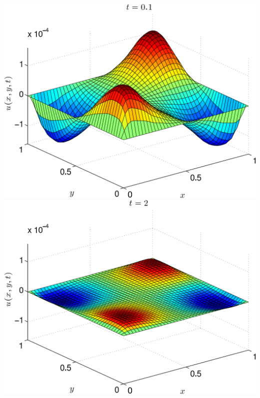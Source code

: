 {\begin{solution}
\begin{enumerate}
\includegraphics[scale=0.4]{heat2d3}
\includegraphics[scale=0.4]{heat2d4}


\end{enumerate}
\end{solution}}{}

